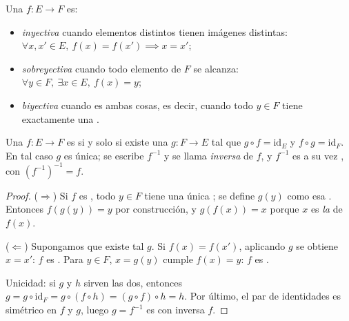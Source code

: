 \begin{definition}\label{def:b1:logic:inj}
Una  $f \colon E \to F$ es:
\begin{itemize}
  \item \emph{inyectiva} cuando elementos distintos
        tienen imágenes distintas: $\forall x, x' \in E,\ f(x) = f(x')
        \implies x = x'$;
  \item \emph{sobreyectiva} cuando todo elemento de
        $F$ se alcanza: $\forall y \in F,\ \exists x \in E,\ f(x) = y$;
  \item \emph{biyectiva} cuando es ambas cosas, es
        decir, cuando todo $y \in F$ tiene exactamente una
        .
\end{itemize}
\end{definition}

\begin{theorem}\label{thm:b1:logic:inverse}
Una  $f \colon E \to F$ es  si y solo si existe
una  $g \colon F \to E$ tal que $g \circ f = \mathrm{id}_E$
y $f \circ g = \mathrm{id}_F$. En tal caso $g$ es única; se escribe
$f^{-1}$ y se llama \emph{inversa} de $f$, y $f^{-1}$ es a su vez
, con $(f^{-1})^{-1} = f$.
\end{theorem}

\begin{proof}
($\Rightarrow$) Si $f$ es , todo $y \in F$ tiene una única
; se define $g(y)$ como esa .
Entonces $f(g(y)) = y$ por construcción, y $g(f(x)) = x$ porque $x$ es
\emph{la}  de $f(x)$.

($\Leftarrow$) Supongamos que existe tal $g$. Si $f(x) = f(x')$,
aplicando $g$ se obtiene $x = x'$: $f$ es . Para $y \in F$,
$x = g(y)$ cumple $f(x) = y$: $f$ es .

Unicidad: si $g$ y $h$ sirven las dos, entonces $g = g \circ
\mathrm{id}_F = g \circ (f \circ h) = (g \circ f) \circ h = h$. Por
último, el par de identidades es simétrico en $f$ y $g$, luego
$g = f^{-1}$ es  con inversa $f$.
\end{proof}

